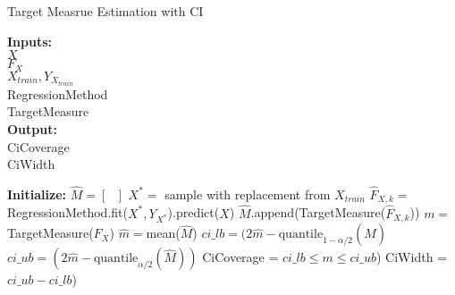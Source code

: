 \begin{algorithm}[!ht] \caption{Target Measrue Estimation with CI}
 \hspace*{\algorithmicindent} \textbf{Inputs:} \\
 \hspace*{\algorithmicindent} $X$  \\
 \hspace*{\algorithmicindent} $F_X$   \\
 \hspace*{\algorithmicindent} $X_{train}, Y_{X_{train}}$  \\
 \hspace*{\algorithmicindent} RegressionMethod  \\
 \hspace*{\algorithmicindent} TargetMeasure  \\
 \hspace*{\algorithmicindent} \textbf{Output:} \\
 \hspace*{\algorithmicindent} CiCoverage \\
 \hspace*{\algorithmicindent} CiWidth \\
\begin{algorithmic}[1]
    \State \textbf{Initialize:} $\hat{M} = \left[ \text{ } \right]$
     
        \State $X^{\ast} = $ sample with replacement from $X_{train}$
        \State $\hat{F}_{X,k} = $ RegressionMethod.fit($X^{\ast}, Y_{X^{\ast}}$).predict($X$)
        \State $\hat{M}$.append(TargetMeasure($\hat{F}_{X, k}$)) 
    \EndFor
    \State $m =$ TargetMeasure($F_X$) 
    \State $\hat{m} = $mean($\hat{M}$)
    \State $ci\_lb = (2\hat{m} - \text{quantile}_{1-\alpha/2}(\hat{M})$ 
    \State $ci\_ub = (2\hat{m} - \text{quantile}_{\alpha/2}(\hat{M}))$ 
    \State CiCoverage = $ ci\_lb \leq m \leq ci\_ub$)
    \State CiWidth = $ci\_ub - ci\_lb $)
\end{algorithmic}
\end{algorithm}\label{pc:target-measure-baseline}



